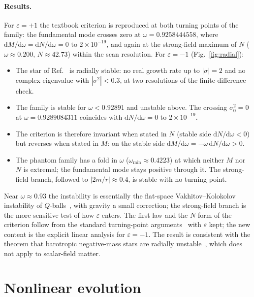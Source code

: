 \documentclass[11pt]{article}
\theoremstyle{remark}
\newcommand{\dd}{\mathrm{d}}
\begin{document}
\paragraph{Results.} For $\varepsilon=+1$ the textbook criterion is reproduced at both turning points of the family: the
fundamental mode crosses zero at $\omega=0.9258444558$, where $\dd M/\dd\omega=\dd N/\dd\omega=0$ to $2\times10^{-19}$, and
again at the strong-field maximum of $N$ ($\omega\approx0.200$, $N\approx42.73$) within the scan resolution. For
$\varepsilon=-1$ (Fig.~\ref{fig:radial}):
\begin{itemize}
\item The star of Ref.~\cite{Shirokov2026} is radially stable: no real growth rate up to $|\sigma|=2$ and no complex
eigenvalue with $|\sigma^2|<0.3$, at two resolutions of the finite-difference check.
\item The family is stable for $\omega<0.92891$ and unstable above. The crossing $\sigma_0^2=0$ at $\omega=0.9289084311$
coincides with $\dd N/\dd\omega=0$ to $2\times10^{-19}$.
\item The criterion is therefore invariant when stated in $N$ (stable side $\dd N/\dd\omega<0$) but reverses when
stated in $M$: on the stable side $\dd M/\dd\omega=-\omega\,\dd N/\dd\omega>0$.
\item The phantom family has a fold in $\omega$ ($\omega_{\min}\approx0.4223$) at which neither $M$ nor $N$ is
extremal; the fundamental mode stays positive through it. The strong-field branch, followed to $|2m/r|\approx0.4$, is
stable with no turning point.
\end{itemize}
Near $\omega\approx0.93$ the instability is essentially the flat-space Vakhitov--Kolokolov instability of
$Q$-balls~\cite{Coleman1985,FLP1987}, with gravity a small correction; the strong-field branch is the more sensitive
test of how $\varepsilon$ enters. The first law and the $N$-form of the criterion follow from the standard turning-point
arguments~\cite{Sorkin1982,LeePang1989,KMS1991} with $\varepsilon$ kept; the new content is the explicit linear analysis
for $\varepsilon=-1$. The result is consistent with the theorem that barotropic negative-mass stars are radially
unstable~\cite{Alves2025}, which does not apply to scalar-field matter.

\section{Nonlinear evolution}\label{sec:evol}
\end{document}
